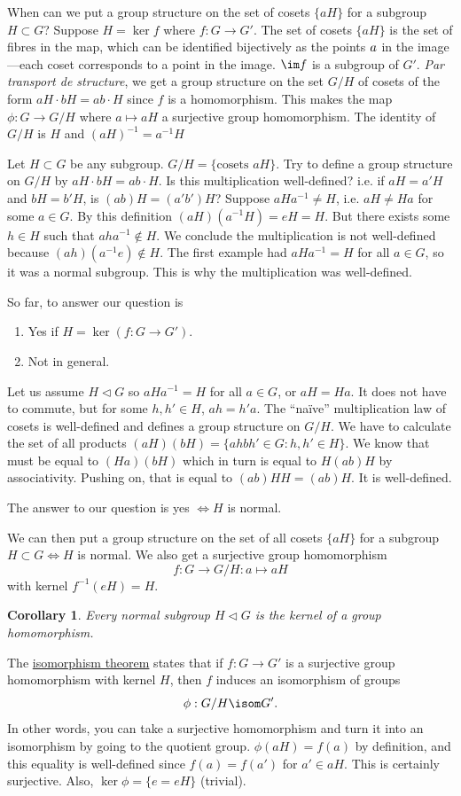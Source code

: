 \documentclass[11pt, oneside]{amsart}
\numberwithin{equation}{section}
\numberwithin{theorem}{section}
\newtheorem{corollary}[theorem]{Corollary}
\theoremstyle{definition}
\let\bar\relax
\begin{document}
When can we put a group structure on the set of cosets $\{aH\}$ for a subgroup $H\subset G$? Suppose $H = \ker f$ where $f:G\to G'$. The set of cosets $\{aH\}$ is the set of fibres in the map, which can be identified bijectively as the points $\bar{a}$ in the image---each coset corresponds to a point in the image. $\im f$ is a subgroup of $G'$. \textit{Par transport de structure}, we get a group structure on the set $G/H$ of cosets of the form $aH \cdot bH = ab\cdot H$ since $f$ is a homomorphism. This makes the map $\phi: G\to G/H$ where $a\mapsto aH$ a surjective group homomorphism. The identity of $G/H$ is $H$ and $(aH)^{-1}=a^{-1}H$

Let $H\subset G$ be any subgroup. $G/H=\{\textrm{cosets } aH\}$. Try to define  a group structure on $G/H$ by $aH\cdot bH=ab\cdot H$. Is this multiplication well-defined? i.e. if $aH=a'H$ and $bH=b'H$, is $(ab)H=(a'b')H$? Suppose $aHa^{-1}\neq H$, i.e. $aH\neq Ha$ for some $a\in G$. By this definition $(aH)(a^{-1}H)=eH=H$. But there exists some $h\in H$ such that $aha^{-1}\notin H$. We conclude the multiplication is not well-defined because $(ah)(a^{-1}e)\notin H$. The first example had $aHa^{-1}=H$ for all $a\in G$, so it was a normal subgroup. This is why the multiplication was well-defined.

So far, to answer our question is
\begin{enumerate}[label=(\roman*)]
\item Yes if $H=\ker (f:G\to G')$.
\item Not in general.
\end{enumerate}

Let us assume $H\lhd G$ so $aHa^{-1}=H$ for all $a\in G$, or $aH= Ha$. It does not have to commute, but for some $h,h'\in H$, $ah=h'a$. The ``na\"ive'' multiplication law of cosets is well-defined and defines a group structure on $G/H$. We have to calculate the set of all products $(aH) (bH )=\{ahbh'\in G : h,h'\in H\}$. We know that must be equal to $(Ha)(bH)$ which in turn is equal to $H(ab)H$ by associativity. Pushing on, that is equal to $(ab)HH=(ab)H$. It is well-defined. 

The answer to our question is yes $\iff H$ is normal.

We can then put a group structure on the set of all cosets $\{aH\}$ for a subgroup $H\subset G \iff H$ is normal. We also get a surjective group homomorphism 
$$
f: G\to G/H:a\mapsto aH
$$
with kernel $f^{-1}(eH)=H$.

\begin{corollary}
Every normal subgroup $H\lhd G$ is the kernel of a group homomorphism.
\end{corollary}
The \underline{isomorphism theorem} states that if $f:G\to G'$ is a surjective group homomorphism with kernel $H$, then $f$ induces an isomorphism of groups
$$
{\phi} : G/H\isom G'.
$$
In other words, you can take a surjective homomorphism and turn it into an isomorphism by going to the quotient group.
$\phi(aH)=f(a)$ by definition, and this equality is well-defined since $f(a)=f(a')$ for $a'\in aH$. This is certainly surjective. Also, $\ker \phi = \{e=eH\}$ (trivial). 
\end{document}
